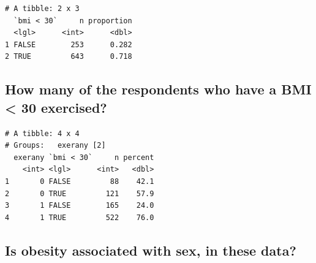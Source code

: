 \documentclass[]{book}
\newenvironment{Shaded}{\begin{snugshade}}{\end{snugshade}}
\newcommand{\KeywordTok}[1]{\textcolor[rgb]{0.13,0.29,0.53}{\textbf{#1}}}
\newcommand{\DataTypeTok}[1]{\textcolor[rgb]{0.13,0.29,0.53}{#1}}
\newcommand{\DecValTok}[1]{\textcolor[rgb]{0.00,0.00,0.81}{#1}}
\newcommand{\StringTok}[1]{\textcolor[rgb]{0.31,0.60,0.02}{#1}}
\newcommand{\OperatorTok}[1]{\textcolor[rgb]{0.81,0.36,0.00}{\textbf{#1}}}
\newcommand{\NormalTok}[1]{#1}
\theoremstyle{definition}
\theoremstyle{definition}
\theoremstyle{definition}
\theoremstyle{remark}
\begin{document}
\begin{Shaded}
\end{Shaded}

\begin{verbatim}
# A tibble: 2 x 3
  `bmi < 30`     n proportion
  <lgl>      <int>      <dbl>
1 FALSE        253      0.282
2 TRUE         643      0.718
\end{verbatim}

\subsection{How many of the respondents who have a BMI \textless{} 30
exercised?}\label{how-many-of-the-respondents-who-have-a-bmi-30-exercised}

\begin{Shaded}
\end{Shaded}

\begin{verbatim}
# A tibble: 4 x 4
# Groups:   exerany [2]
  exerany `bmi < 30`     n percent
    <int> <lgl>      <int>   <dbl>
1       0 FALSE         88    42.1
2       0 TRUE         121    57.9
3       1 FALSE        165    24.0
4       1 TRUE         522    76.0
\end{verbatim}

\subsection{Is obesity associated with sex, in these
data?}\label{is-obesity-associated-with-sex-in-these-data}
\end{document}
